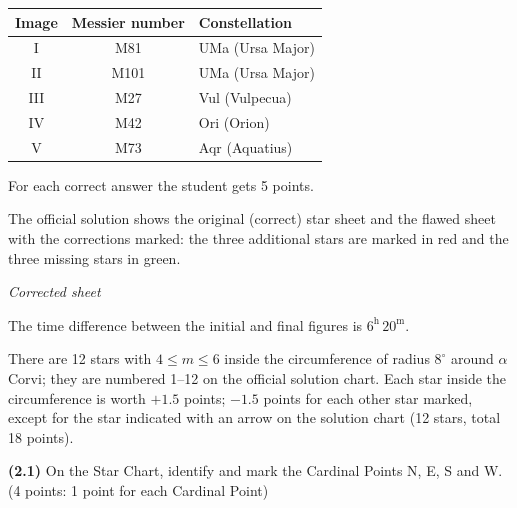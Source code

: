 \begin{center}
\begin{tabular}{ccl}
Image & Messier number & Constellation \\
\hline
I & M81 & UMa (Ursa Major) \\
II & M101 & UMa (Ursa Major) \\
III & M27 & Vul (Vulpecua) \\ %
IV & M42 & Ori (Orion) \\
V & M73 & Aqr (Aquatius) \\ %
\end{tabular}
\end{center}

For each correct answer the student gets 5 points.

The official solution shows the original (correct) star sheet and the flawed
sheet with the corrections marked: the three additional stars are marked in
red and the three missing stars in green.

\begin{center}\textit{Corrected sheet}\end{center}

The time difference between the initial and final figures is
$6^{\mathrm{h}}\,20^{\mathrm{m}}$.

There are 12 stars with $4 \le m \le 6$ inside the circumference of radius
$8^\circ$ around $\alpha$ Corvi; they are numbered 1--12 on the official
solution chart. Each star inside the circumference is worth $+1.5$ points;
$-1.5$ points for each other star marked, except for the star indicated with
an arrow on the solution chart (12 stars, total 18 points).


\textbf{(2.1)} On the Star Chart, identify and mark the Cardinal Points N, E,
S and W. \hfill(4 points: 1 point for each Cardinal Point)

